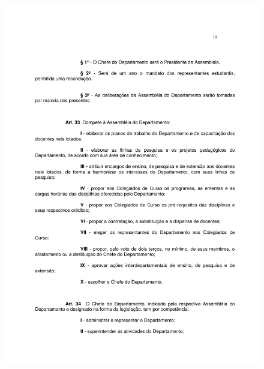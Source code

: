 \begin{figure}[p]
	\centering 
	\includegraphics[scale=0.7]{capitulos/resolucoes/cuni414/cuni414-18.pdf}
\end{figure} \pagebreak

